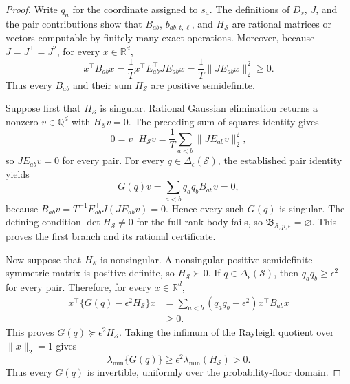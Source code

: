 \documentclass{article}
\begin{document}
\begin{proof}
Write \(q_a\) for the coordinate assigned to \(s_a\).  The definitions of \(D_s\), \(J\), and the pair contributions show that \(B_{ab}\), \(b_{ab,t,\ell}\), and \(H_{\mathcal S}\) are rational matrices or vectors computable by finitely many exact operations.  Moreover, because \(J=J^{\top}=J^2\), for every \(x\in\mathbb R^d\),
\[
 x^{\top}B_{ab}x
 =\frac1T x^{\top}E_{ab}^{\top}JE_{ab}x
 =\frac1T\lVert JE_{ab}x\rVert_2^2\geq0.
\]
Thus every \(B_{ab}\) and their sum \(H_{\mathcal S}\) are positive semidefinite.

Suppose first that \(H_{\mathcal S}\) is singular.  Rational Gaussian elimination returns a nonzero \(v\in\mathbb Q^d\) with \(H_{\mathcal S}v=0\).  The preceding sum-of-squares identity gives
\[
 0=v^{\top}H_{\mathcal S}v
 =\frac1T\sum_{a<b}\lVert JE_{ab}v\rVert_2^2,
\]
so \(JE_{ab}v=0\) for every pair.  For every \(q\in\Delta_{\epsilon}(\mathcal S)\), the established pair identity yields
\[
 G(q)v=\sum_{a<b}q_aq_bB_{ab}v=0,
\]
because \(B_{ab}v=T^{-1}E_{ab}^{\top}J(JE_{ab}v)=0\).  Hence every such \(G(q)\) is singular.  The defining condition \(\det H_{\mathcal S}\neq0\) for the full-rank body fails, so \(\mathfrak B_{\mathcal S,p,\epsilon}=\varnothing\).  This proves the first branch and its rational certificate.

Now suppose that \(H_{\mathcal S}\) is nonsingular.  A nonsingular positive-semidefinite symmetric matrix is positive definite, so \(H_{\mathcal S}\succ0\).  If \(q\in\Delta_{\epsilon}(\mathcal S)\), then \(q_aq_b\geq\epsilon^2\) for every pair.  Therefore, for every \(x\in\mathbb R^d\),
\[
\begin{aligned}
 x^{\top}\{G(q)-\epsilon^2H_{\mathcal S}\}x
 &=\sum_{a<b}(q_aq_b-\epsilon^2)x^{\top}B_{ab}x\\
 &\geq0.
\end{aligned}
\]
This proves \(G(q)\succeq\epsilon^2H_{\mathcal S}\).  Taking the infimum of the Rayleigh quotient over \(\lVert x\rVert_2=1\) gives
\[
 \lambda_{\min}\{G(q)\}
 \geq\epsilon^2\lambda_{\min}(H_{\mathcal S})>0.
\]
Thus every \(G(q)\) is invertible, uniformly over the probability-floor domain.


\end{proof}
\end{document}
